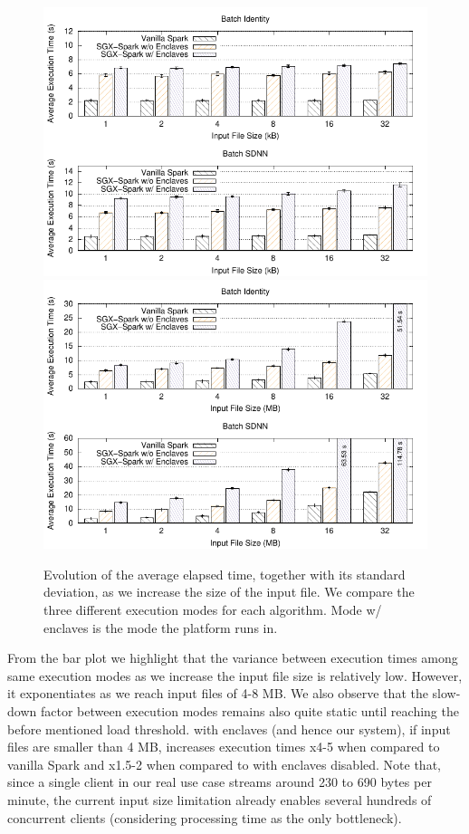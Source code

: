 \begin{figure}[h!]
    \centering
    \includegraphics[width=.85\textwidth]{plots/batch/input_size/input_size.pdf}
    \includegraphics[width=.85\textwidth]{plots/batch/input_size/big_input_size.pdf}
    \caption[Evolution of the average elapsed time as the input workload increases.]{Evolution of the average elapsed time, together with its standard deviation, as we increase the size of the input file. We compare the three different execution modes for each algorithm. Mode \sgxspark w/ enclaves is the mode the platform runs in. \label{fig:batch-input-size}}
\end{figure}

From the bar plot we highlight that the variance between execution times among same execution modes as we increase the input file size is relatively low. 
However, it exponentiates as we reach input files of 4-8 MB.
We also observe that the slow-down factor between execution modes remains also quite static until reaching the before mentioned load threshold. 
\sgxspark with enclaves (and hence our system), if input files are smaller than 4 MB, increases execution times x4-5 when compared to vanilla Spark and x1.5-2 when compared to \sgxspark with enclaves disabled.
Note that, since a single client in our real use case streams around 230 to 690 bytes per minute, the current input size limitation already enables several hundreds of concurrent clients (considering processing time as the only bottleneck).

